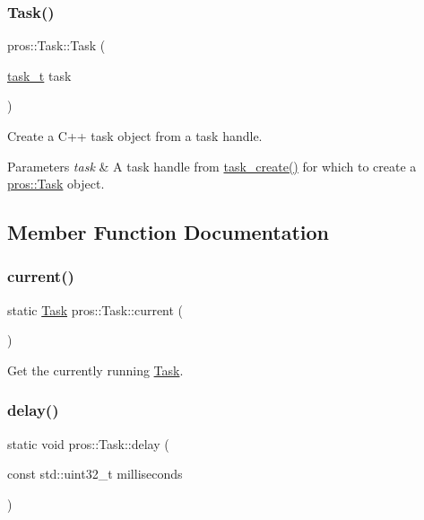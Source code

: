 \subsubsection{\texorpdfstring{Task()}{Task()}\hspace{0.1cm}{\footnotesize\ttfamily [5/5]}}
{\footnotesize\ttfamily pros\+::\+Task\+::\+Task (\begin{DoxyParamCaption}\item[{\hyperlink{rtos_8h_a1d7e0825b8d8876e8cd8ece3f9115293}{task\+\_\+t}}]{task }\end{DoxyParamCaption})}



Create a C++ task object from a task handle. 


\begin{DoxyParams}{Parameters}
{\em task} & A task handle from \hyperlink{rtos_8h_a2e3ed8f26b8c1edcff493bc583f0a76a}{task\+\_\+create()} for which to create a \hyperlink{classpros_1_1Task}{pros\+::\+Task} object. \\
\hline
\end{DoxyParams}


\subsection{Member Function Documentation}
\mbox{\label{classpros_1_1Task_a510ca3e67e54aa4293438d73148a1d6b}} 
\subsubsection{\texorpdfstring{current()}{current()}}
{\footnotesize\ttfamily static \hyperlink{classpros_1_1Task}{Task} pros\+::\+Task\+::current (\begin{DoxyParamCaption}{ }\end{DoxyParamCaption})\hspace{0.3cm}{\ttfamily [static]}}



Get the currently running \hyperlink{classpros_1_1Task}{Task}. 

\mbox{\label{classpros_1_1Task_a4341b580544831eea11b840cf068587b}} 
\subsubsection{\texorpdfstring{delay()}{delay()}}
{\footnotesize\ttfamily static void pros\+::\+Task\+::delay (\begin{DoxyParamCaption}\item[{const std\+::uint32\+\_\+t}]{milliseconds }\end{DoxyParamCaption})\hspace{0.3cm}{\ttfamily [static]}}



